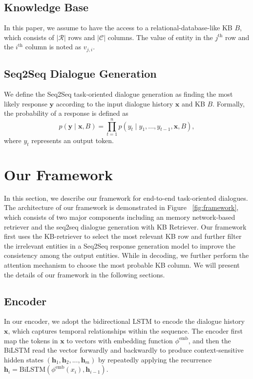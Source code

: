 \documentclass[11pt,a4paper]{article}
\begin{document}
\subsection{Knowledge Base}
In this paper, we assume to 
have the 
access 
to a relational-database-like 
KB  $B$,
which consists of $|\mathcal{R}|$ rows and $|\mathcal{C}|$ columns.
The value of entity in the $j^{\text{th}}$ row and the $i^{\text{th}}$ column is noted as $v_{j, i}$.

\subsection{Seq2Seq Dialogue Generation}
We define the Seq2Seq task-oriented dialogue generation
as finding the most likely response $\mathbf{y}$
according to the input dialogue history $\mathbf{x}$ and KB $B$.
Formally, the probability of a response is defined as
\[
p(\mathbf{y} \mid \mathbf{x}, B) = \prod_{t=1}^{n}  p (y_t \mid  y_1, ..., y_{t - 1}, \mathbf{x}, B),
\]
where $y_t$ represents an output token.


\section{Our Framework}
In this section, we describe our framework for end-to-end task-oriented dialogues.
The architecture of our framework is demonstrated in Figure ~\ref{fig:framework},  
which consists of two major components including an memory network-based retriever and the seq2seq dialogue generation with KB Retriever.
Our framework first uses the  KB-retriever to select the most relevant KB row and further filter the irrelevant entities
in a Seq2Seq response generation model
to improve the consistency among the output entities.
While in decoding, we further perform the attention mechanism to choose the most probable KB column.
We will present the details of our framework in the following sections.

\subsection{Encoder}
In our encoder, we adopt the bidirectional LSTM 
\cite[BiLSTM]{hochreiter1997long} to encode the dialogue history  $\mathbf{x}$, 
which captures temporal relationships within the sequence.
The encoder first map the tokens in $\mathbf{x}$ to vectors
with embedding function $\phi^{\text{emb}}$,
and then the BiLSTM read the vector forwardly and backwardly to produce context-sensitive  hidden states $(\mathbf{h}_{1}, \mathbf{h}_2, ..., \mathbf{h}_{m})$
by repeatedly applying the recurrence 
$\mathbf{h}_{i}=\text{BiLSTM}\left( \phi ^{\text{emb}}\left( x_{i}\right) , \mathbf{h}_{i-1}\right)$.
\end{document}
